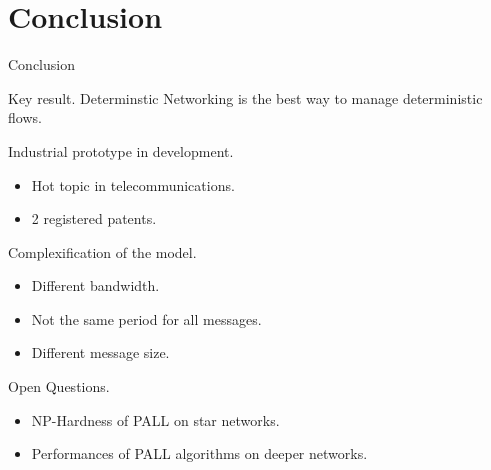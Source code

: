 \documentclass[10 pt]{beamer}
\begin{document}
\section{Conclusion}
\begin{frame}{Conclusion}


\begin{block}{Key result.}
  Determinstic Networking is the best way to manage deterministic flows.
\end{block}

\begin{block}{Industrial prototype in development.}
\begin{itemize}
    \item Hot topic in telecommunications.
    \item 2 registered patents.
      \end{itemize}
\end{block}
  
\begin{block}{Complexification of the model.}
  \begin{itemize}
      \item Different bandwidth.
      \item Not the same period for all messages.
      \item Different message size.
    \end{itemize}
\end{block}

\begin{block}{Open Questions.}
  \begin{itemize}
      \item NP-Hardness of PALL on star networks.
      \item Performances of PALL algorithms on deeper networks.
    \end{itemize}
\end{block}


\end{frame}
\end{document}
